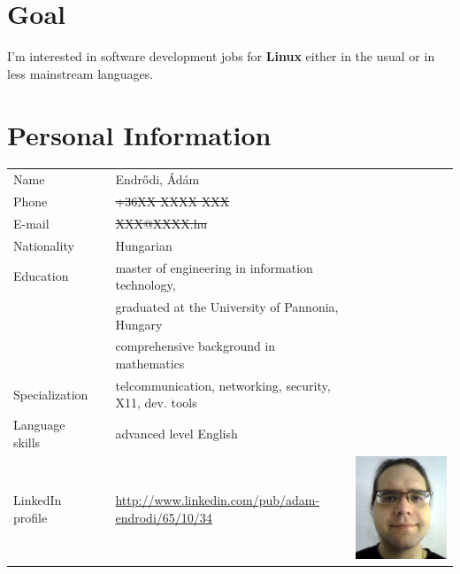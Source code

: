 \documentclass[a4paper,12pt]{article}
\newcommand\Yell{\textbf}
\begin{document}
\section{Goal}

I'm interested in software development jobs for \Yell{Linux} either in
the usual or in less mainstream languages.

\section{Personal Information}

\begin{tabularx}{\linewidth}{lXll}
Name			&& Endr\H{o}di, \'Ad\'am	&			\\
Phone			&& \sout{+36XX XXXX XXX}	&			\\
E-mail			&& \sout{XXX@XXXX.hu}		&			\\
Nationality		&& Hungarian			&			\\
Education		&& master of engineering in information technology, &	\\
			&& graduated at the University of Pannonia, Hungary &	\\
			&& comprehensive background in mathematics &		\\
Specialization		&& telcommunication, networking, security, X11, dev. tools
			 & \\
Language skills		&& advanced level English	&			\\
LinkedIn profile	&& \url{http://www.linkedin.com/pub/adam-endrodi/65/10/34}
			 & \includegraphics*[scale=0.2,viewport=0 0 400 1,clip=false]{me} \\
\end{tabularx}
\end{document}

